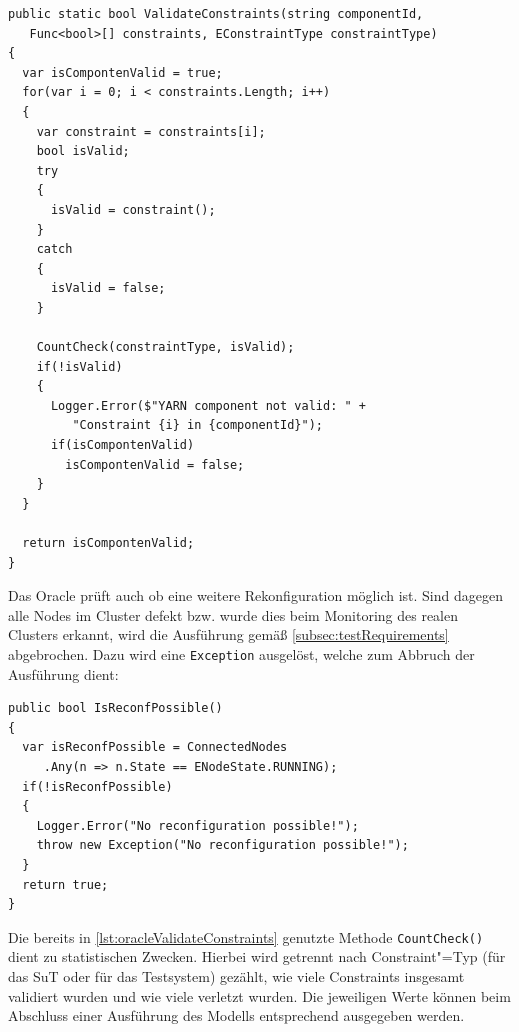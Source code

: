 \begin{lstlisting}[label=lst:oracleValidateConstraints,style=cs,
caption={[Validieren der Constraints durch das Oracle]
    Validieren der Constraints durch das Oracle.
    Die zu validierenden Constraints werden im Parameter \texttt{constraints} übergeben, der Parameter \texttt{constraintType} dient zu statistischen Zwecken in \texttt{CountCheck()}.}]
public static bool ValidateConstraints(string componentId,
   Func<bool>[] constraints, EConstraintType constraintType)
{
  var isCompontenValid = true;
  for(var i = 0; i < constraints.Length; i++)
  {
    var constraint = constraints[i];
    bool isValid;
    try
    {
      isValid = constraint();
    }
    catch
    {
      isValid = false;
    }
    
    CountCheck(constraintType, isValid);
    if(!isValid)
    {
      Logger.Error($"YARN component not valid: " +
         "Constraint {i} in {componentId}");
      if(isCompontenValid)
        isCompontenValid = false;
    }
  }
  
  return isCompontenValid;
}
\end{lstlisting}

Das Oracle prüft auch ob eine weitere Rekonfiguration möglich ist.
Sind dagegen alle Nodes im Cluster defekt bzw. wurde dies beim Monitoring des realen Clusters erkannt, wird die Ausführung gemäß \cref{subsec:testRequirements} abgebrochen.
Dazu wird eine \texttt{Exception} ausgelöst, welche zum Abbruch der Ausführung dient:

\begin{lstlisting}[label=lst:oracleIsReconfPossible,style=cs,
caption={Prüfung nach der Möglichkeit weiterer Rekonfigurationen}]
public bool IsReconfPossible()
{
  var isReconfPossible = ConnectedNodes
     .Any(n => n.State == ENodeState.RUNNING);
  if(!isReconfPossible)
  {
    Logger.Error("No reconfiguration possible!");
    throw new Exception("No reconfiguration possible!");
  }
  return true;
}
\end{lstlisting}

Die bereits in \cref{lst:oracleValidateConstraints} genutzte Methode \texttt{CountCheck()} dient zu statistischen Zwecken.
Hierbei wird getrennt nach Constraint"=Typ (für das \gls{SuT} oder für das Testsystem) gezählt, wie viele Constraints insgesamt validiert wurden und wie viele verletzt wurden.
Die jeweiligen Werte können beim Abschluss einer Ausführung des Modells entsprechend ausgegeben werden.
